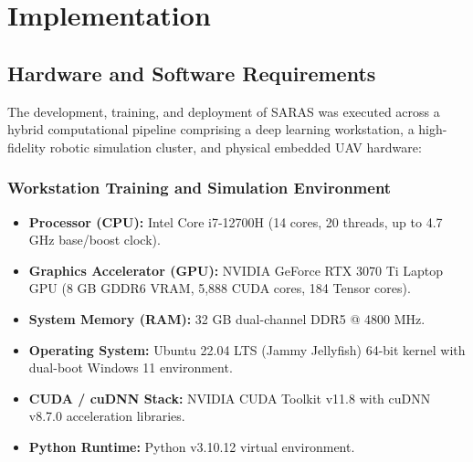 \chapter{Implementation}

\section{Hardware and Software Requirements}

The development, training, and deployment of SARAS was executed across a hybrid computational pipeline comprising a deep learning workstation, a high-fidelity robotic simulation cluster, and physical embedded UAV hardware:

\subsection{Workstation Training and Simulation Environment}
\begin{itemize}
    \item \textbf{Processor (CPU):} Intel Core i7-12700H (14 cores, 20 threads, up to 4.7 GHz base/boost clock).
    \item \textbf{Graphics Accelerator (GPU):} NVIDIA GeForce RTX 3070 Ti Laptop GPU (8 GB GDDR6 VRAM, 5,888 CUDA cores, 184 Tensor cores).
    \item \textbf{System Memory (RAM):} 32 GB dual-channel DDR5 @ 4800 MHz.
    \item \textbf{Operating System:} Ubuntu 22.04 LTS (Jammy Jellyfish) 64-bit kernel with dual-boot Windows 11 environment.
    \item \textbf{CUDA / cuDNN Stack:} NVIDIA CUDA Toolkit v11.8 with cuDNN v8.7.0 acceleration libraries.
    \item \textbf{Python Runtime:} Python v3.10.12 virtual environment.
\end{itemize}

